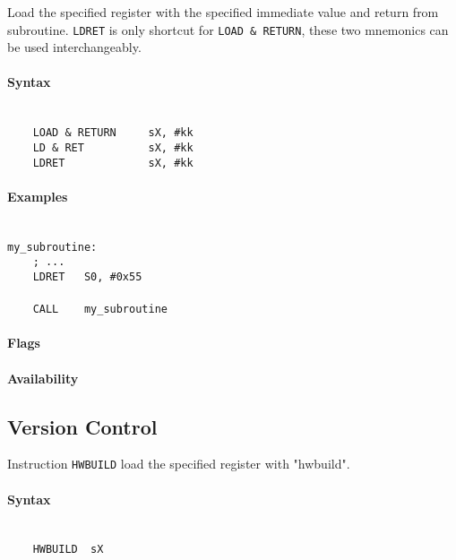     \clearpage
        Load the specified register with the specified immediate value and return from subroutine. \texttt{LDRET} is only shortcut for \texttt{LOAD \& RETURN}, these two mnemonics can be used interchangeably.

        \paragraph{Syntax}
            ~\\
            \verb'    LOAD & RETURN     sX, #kk'\\
            \verb'    LD & RET          sX, #kk'\\
            \verb'    LDRET             sX, #kk'\\

        \paragraph{Examples}
            ~\\
            \verb'my_subroutine:'\\
            \verb'    ; ...'\\
            \verb'    LDRET   S0, #0x55'\\
            \verb''\\
            \verb'    CALL    my_subroutine'\\

        \paragraph{Flags}

        \paragraph{Availability}
            \pbavailability{\yes}{\no}{\no}{\no}{\no}

\clearpage
\subsection{Version Control}
        Instruction \texttt{HWBUILD} load the specified register with "hwbuild".
        \paragraph{Syntax}
            ~\\
            \verb'    HWBUILD  sX'\\

